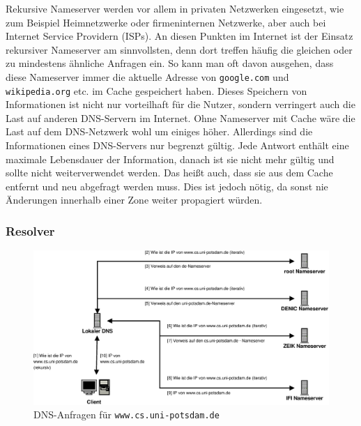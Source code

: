 \documentclass[a4paper, 12pt, BCOR10mm, DIV12, toc=bibliography, toc=listof, german]{scrbook}
\begin{document}
			Rekursive Nameserver werden vor allem in privaten Netzwerken eingesetzt, wie zum Beispiel
			Heimnetzwerke oder firmeninternen Netzwerke, aber auch bei Internet Service Providern
			(ISPs). An diesen Punkten im Internet ist der Einsatz rekursiver Nameserver am sinnvollsten,
			denn dort treffen häufig die gleichen oder zu mindestens ähnliche Anfragen ein. So kann man
			oft davon ausgehen, dass diese Nameserver immer die aktuelle Adresse von \texttt{google.com} und
			\texttt{wikipedia.org} etc. im Cache gespeichert haben. Dieses Speichern von Informationen
			ist nicht nur vorteilhaft für die Nutzer, sondern verringert auch die Last auf anderen
			DNS-Servern im Internet. Ohne Nameserver mit Cache wäre die Last auf dem DNS-Netzwerk wohl um
			einiges höher. Allerdings sind die Informationen eines DNS-Servers nur begrenzt gültig.
			Jede Antwort enthält eine maximale Lebensdauer der Information, danach ist sie nicht mehr
			gültig und sollte nicht weiterverwendet werden. Das heißt auch, dass sie aus dem Cache entfernt
			und neu abgefragt werden muss. Dies ist jedoch nötig, da sonst nie Änderungen innerhalb einer Zone
			weiter propagiert würden.


			\subsubsection*{Resolver} %

				\begin{figure}
					\centering
					\includegraphics[width=\textwidth]{images/request}
					\caption{DNS-Anfragen für \texttt{www.cs.uni-potsdam.de}} %
					\label{fig:bsp-request}
				\end{figure}
\end{document}
